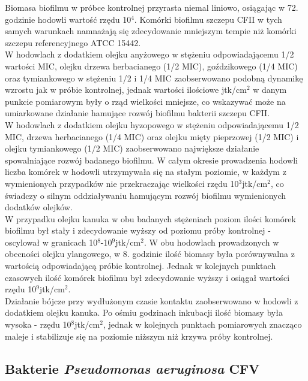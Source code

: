 \documentclass[11pt,a4paper]{report}
\begin{document}
Biomasa biofilmu w próbce kontrolnej przyrasta niemal liniowo, osiągając w 72. godzinie hodowli wartość rzędu 10$^4$.
Komórki biofilmu szczepu CFII w tych samych warunkach namnażają się zdecydowanie mniejszym tempie niż komórki szczepu referencyjnego ATCC 15442.\\
W hodowlach z dodatkiem olejku anyżowego w stężeniu odpowiadającemu 1/2 wartości MIC, olejku drzewa herbacianego (1/2 MIC), goździkowego (1/4 MIC) oraz tymiankowego w stężeniu 1/2 i 1/4 MIC zaobserwowano podobną dynamikę wzrostu jak w próbie kontrolnej, jednak wartości ilościowe jtk/cm$^2$ w danym punkcie pomiarowym były o rząd wielkości mniejsze, co wskazywać może na umiarkowane działanie hamujące rozwój biofilmu bakterii szczepu CFII.\\
W hodowlach z dodatkiem olejku hyzopowego w stężeniu odpowiadającemu 1/2 MIC, drzewa herbacianego (1/4 MIC) oraz olejku mięty pieprzowej (1/2 MIC) i olejku tymiankowego (1/2 MIC) zaobserwowano największe działanie spowalniające rozwój badanego biofilmu. W całym okresie prowadzenia hodowli liczba komórek w hodowli utrzymywała się na stałym poziomie, w każdym z wymienionych przypadków nie przekraczając wielkości rzędu 10$^3$jtk/cm$^2$, co świadczy o silnym oddziaływaniu hamującym rozwój biofilmu wymienionych dodatków olejków.\\
W przypadku olejku kanuka w obu badanych stężeniach poziom ilości komórek biofilmu był stały i zdecydowanie wyższy od poziomu próby kontrolnej - oscylował w granicach 10$^8$-10$^9$jtk/cm$^2$.
W obu hodowlach prowadzonych w obecności olejku ylangowego, w 8. godzinie ilość biomasy była porównywalna z wartością odpowiadającą próbie kontrolnej. Jednak w kolejnych punktach czasowych ilość komórek biofilmu był zdecydowanie wyższy i osiągał wartości rzędu 10$^9$jtk/cm$^2$.\\
Działanie bójcze przy wydłużonym czasie kontaktu zaobserwowano w hodowli z dodatkiem olejku kanuka. Po ośmiu godzinach inkubacji ilość biomasy była wysoka - rzędu 10$^8$jtk/cm$^2$, jednak w kolejnych punktach pomiarowych znacząco maleje i stabilizuje się na poziomie niższym niż krzywa próby kontrolnej.


\clearpage

\subsection{Bakterie \textit{Pseudomonas aeruginosa} CFV}
\end{document}
